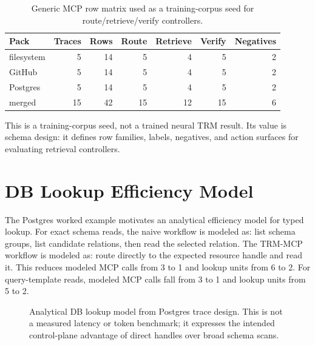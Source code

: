 \documentclass[11pt]{article}
\begin{document}
\begin{table}[t]
\centering
\small
\begin{tabular}{lrrrrrr}
\toprule
Pack & Traces & Rows & Route & Retrieve & Verify & Negatives\\
\midrule
filesystem & 5 & 14 & 5 & 4 & 5 & 2\\
GitHub & 5 & 14 & 5 & 4 & 5 & 2\\
Postgres & 5 & 14 & 5 & 4 & 5 & 2\\
\midrule
merged & 15 & 42 & 15 & 12 & 15 & 6\\
\bottomrule
\end{tabular}
\caption{Generic MCP row matrix used as a training-corpus seed for route/retrieve/verify controllers.}
\label{tab:matrix}
\end{table}

This is a training-corpus seed, not a trained neural TRM result. Its value is schema design: it defines row families, labels, negatives, and action surfaces for evaluating retrieval controllers.

\section{DB Lookup Efficiency Model}

The Postgres worked example motivates an analytical efficiency model for typed lookup. For exact schema reads, the naive workflow is modeled as: list schema groups, list candidate relations, then read the selected relation. The TRM-MCP workflow is modeled as: route directly to the expected resource handle and read it. This reduces modeled MCP calls from 3 to 1 and lookup units from 6 to 2. For query-template reads, modeled MCP calls fall from 3 to 1 and lookup units from 5 to 2.

\begin{figure}[t]
\centering
{}
\caption{Analytical DB lookup model from Postgres trace design. This is not a measured latency or token benchmark; it expresses the intended control-plane advantage of direct handles over broad schema scans.}
\label{fig:dbmodel}
\end{figure}
\end{document}
